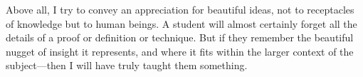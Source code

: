 \documentclass{article}
\begin{document}
Above all, I try to convey an appreciation for beautiful ideas,
not to receptacles of knowledge but to human beings. A student will
almost certainly forget all the details of a proof or definition or
technique.  But if they remember the beautiful nugget of insight it
represents, and where it fits within the larger context of the
subject---then I will have truly taught them something.

% 
\end{document}
